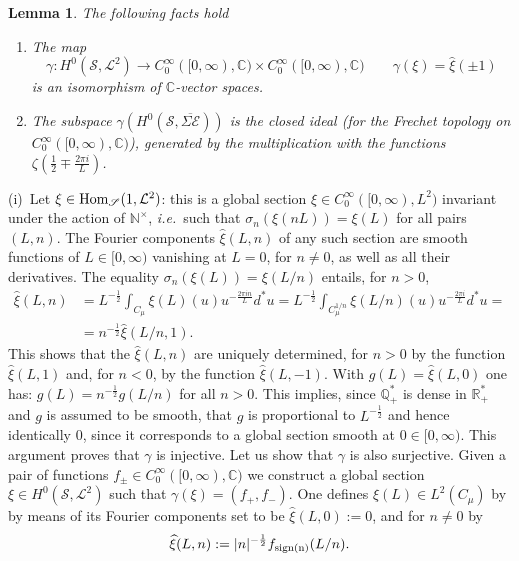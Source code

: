 \documentclass{pspum-l}
\newtheorem{lemma}[theorem]{Lemma}
\theoremstyle{definition}
\theoremstyle{remark}
\numberwithin{equation}{section}
\newcommand{\ie}{{\it i.e.\/}\ }
\def\C{{\mathbb C}}
\def\Q{{\mathbb Q}}
\def\R{{\mathbb R}}
\def\cE{{\mathcal E}}
\def\cL{{\mathcal L}}
\def\Hom{{\rm Hom}}
\def\nt{\N^{\times}}
\def\N{{\mathbb N}}
\def\scal2{{\mathscr S}}
\begin{document}
\begin{lemma}\label{sheaves1} The following facts hold
 \begin{enumerate}
     \item[(i)] The map 
  \begin{equation}\label{mapgamma}
 \gamma:H^0(\scal2,\cL^2)\to C_0^{\infty}([0,\infty),\C)\times C_0^{\infty}([0,\infty),\C)\qquad \gamma(\xi)=\widehat \xi(\pm 1)
\end{equation}
is an isomorphism of $\C$-vector spaces.
 \item[(ii)] The subspace $\gamma(H^0(\scal2,\overline{\Sigma\cE}))$ is the closed ideal (for the Frechet topology on $C_0^{\infty}([0,\infty),\C)$), generated by the multiplication with the functions $\zeta\left(\frac 12 \mp\frac{ 2\pi i }{L}\right)$.
 \end{enumerate}
 \end{lemma}
\proof (i)~Let $\xi\in\Hom_{\scal2}(1,\cL^2)$: this is a global section $\xi \in C_0^{\infty}([0,\infty),L^2)$ invariant under the action of $\nt$, \ie such that  $\sigma_n(\xi(nL))=\xi(L)$ for all pairs $(L,n)$. The Fourier components $\widehat \xi(L,n)$ of any such section are smooth functions of $L\in [0,\infty)$ vanishing  at $L=0$, for $n\neq 0$, as well as all their derivatives. The equality $\sigma_n(\xi(L))=\xi(L/n)$ entails, for $n>0$, 
\begin{align*}
\widehat \xi(L,n)&=L^{-\frac 12}\int_{C_\mu} \xi(L)(u)u^{-\frac{2\pi i n}{L}}d^*u=L^{-\frac 12}\int_{C_{\mu}^{1/n}} \xi(L/n)(u)u^{-\frac{2\pi i }{L}}d^*u=\\&=n^{-\frac 12}\widehat \xi(L/n,1).
\end{align*}
 This shows that the $\widehat \xi(L,n)$ are uniquely determined, for $n>0$ by the function $\widehat \xi(L,1)$ and,  for $n<0$, by the function $\widehat \xi(L,-1)$. With $g(L)=\widehat \xi(L,0)$ one has: $g(L)=n^{-\frac 12}g(L/n)$ for all $n>0$. This implies, since $\Q_+^*$ is dense in $\R_+^*$ and $g$ is assumed to be smooth, that $g$ is proportional to $L^{-\frac 12}$ and hence  identically $0$, since it corresponds to a global section smooth at $0\in [0,\infty)$. This argument proves that  $ \gamma$ is injective. Let us show that $\gamma$ is also surjective. Given a pair of functions $f_\pm\in C_0^{\infty}([0,\infty),\C)$ we  construct a global section $\xi\in H^0(\scal2,\cL^2)$ such that $\gamma(\xi)=(f_+,f_-)$. One defines $\xi(L)\in L^2(C_\mu)$ by by means of its Fourier components  set to be $ \widehat \xi(L,0):=0$, and  for $n\neq 0$ by
 \[
 \widehat \xi(L,n):=\vert n\vert^{-\frac 12}f_{\rm sign(n)}(L/n).
\]
\end{document}
